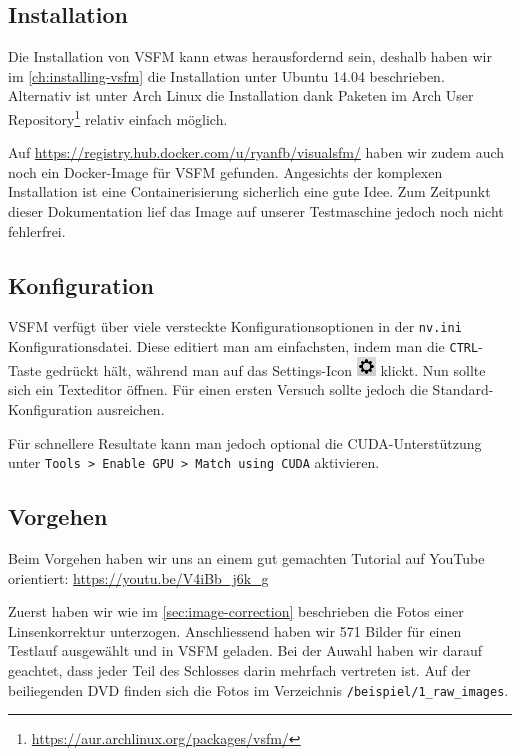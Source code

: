 \subsection{Installation}

Die Installation von VSFM kann etwas herausfordernd sein, deshalb haben wir im
\autoref{ch:installing-vsfm} die Installation unter Ubuntu 14.04 beschrieben.
Alternativ ist unter Arch Linux die Installation dank Paketen im Arch User
Repository\footnote{\url{https://aur.archlinux.org/packages/vsfm/}} relativ
einfach möglich.

Auf \url{https://registry.hub.docker.com/u/ryanfb/visualsfm/} haben wir zudem
auch noch ein Docker-Image für VSFM gefunden. Angesichts der komplexen
Installation ist eine Containerisierung sicherlich eine gute Idee. Zum Zeitpunkt
dieser Dokumentation lief das Image auf unserer Testmaschine jedoch noch nicht
fehlerfrei.

\subsection{Konfiguration}

VSFM verfügt über viele versteckte Konfigurationsoptionen in der \texttt{nv.ini}
Konfigurationsdatei. Diese editiert man am einfachsten, indem man die
\texttt{CTRL}-Taste gedrückt hält, während man auf das Settings-Icon
\includegraphics[scale=0.75]{images/vsfm_icon_settings} klickt. Nun sollte sich
ein Texteditor öffnen. Für einen ersten Versuch sollte jedoch die
Standard-Konfiguration ausreichen.

Für schnellere Resultate kann man jedoch optional die CUDA-Unterstützung unter
\texttt{Tools > Enable GPU > Match using CUDA} aktivieren.

\subsection{Vorgehen}

Beim Vorgehen haben wir uns an einem gut gemachten Tutorial auf YouTube
orientiert: \url{https://youtu.be/V4iBb_j6k_g}

Zuerst haben wir wie im \autoref{sec:image-correction} beschrieben die Fotos
einer Linsenkorrektur unterzogen. Anschliessend haben wir 571 Bilder für einen
Testlauf ausgewählt und in VSFM geladen. Bei der Auwahl haben wir darauf
geachtet, dass jeder Teil des Schlosses darin mehrfach vertreten ist. Auf der
beiliegenden DVD finden sich die Fotos im Verzeichnis
\texttt{/beispiel/1\_raw\_images}.

